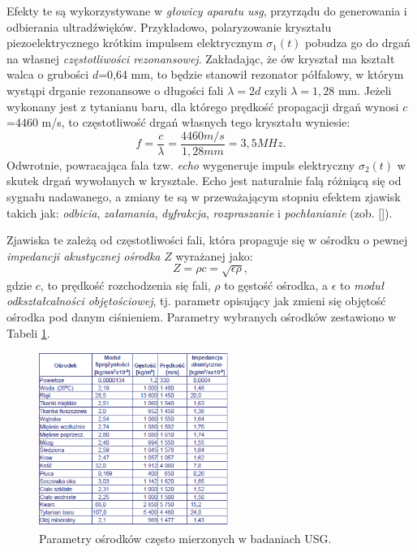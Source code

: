 Efekty te są wykorzystywane w \textit{głowicy aparatu usg}, przyrządu do generowania i odbierania ultradźwięków. Przykładowo, polaryzowanie kryształu piezoelektrycznego krótkim impulsem elektrycznym $\sigma_1(t)$ pobudza go do drgań na własnej \textit{częstotliwości rezonansowej}. Zakładając, że ów kryształ ma kształt walca o grubości $d$=0,64 mm, to będzie stanowił rezonator półfalowy, w którym wystąpi drganie rezonansowe o długości fali $\lambda = 2d$ czyli $\lambda = 1,28$ mm. Jeżeli wykonany jest z tytanianu baru, dla którego prędkość propagacji drgań wynosi $c$=4460 m/s, to częstotliwość drgań własnych tego kryształu wyniesie:
\begin{equation}
f = \frac{c}{\lambda} = \frac{4460 m/s}{1,28 mm} = 3,5 MHz.
\end{equation}
Odwrotnie, powracająca fala tzw. \textit{echo} wygeneruje impuls elektryczny $\sigma_2(t)$ w skutek drgań wywołanych w krysztale. Echo jest naturalnie falą różniącą się od sygnału nadawanego, a zmiany te są w przeważającym stopniu efektem zjawisk takich jak: \textit{odbicia}, \textit{załamania}, \textit{dyfrakcja}, \textit{rozpraszanie} i \textit{pochłanianie} (zob. []).

Zjawiska te zależą od częstotliwości fali, która propaguje się w ośrodku o pewnej \textit{impedancji akustycznej ośrodka} $Z$ wyrażanej jako:
\begin{equation}
Z = \rho c = \sqrt{\epsilon \rho},
\end{equation}
gdzie $c$, to prędkość rozchodzenia się fali, $\rho$ to gęstość ośrodka, a $\epsilon$ to \textit{moduł odkształcalności objętościowej}, tj. parametr opisujący jak zmieni się objętość ośrodka pod danym ciśnieniem. Parametry wybranych ośrodków zestawiono w Tabeli \ref{USG-params}. 
\begin{figure}[h!]
	\centering
	\includegraphics[width=0.55\textwidth]{figures/USG-params.png}
	\caption{Parametry ośrodków często mierzonych w badaniach USG.}
	\label{USG-params}
\end{figure}

